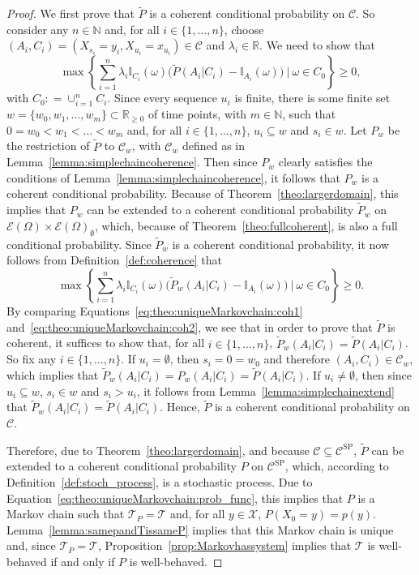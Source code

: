 \documentclass[10pt,a4paper]{paper}
\theoremstyle{definition}
\newcommand{\nats}{\mathbb{N}}
\newcommand{\reals}{\mathbb{R}}
\newcommand{\states}{\mathcal{X}}
\newcommand{\paths}{\Omega}
\newcommand{\power}{\mathcal{E}(\paths)}
\newcommand{\nonemptypower}{\power_{\emptyset}}
\newcommand{\ind}[1]{\mathbb{I}_{#1}}
\newcommand{\coloneqq}{:\!=}
\begin{document}
\begin{proof}
We first prove that $\tilde{P}$ is a coherent conditional probability on $\mathcal{C}$. So consider any $n\in\nats$ and, for all $i\in\{1,\dots,n\}$, choose $(A_i,C_i)=(X_{s_i}=y_i,X_{u_i}=x_{u_i})\in\mathcal{C}$ and $\lambda_i\in\reals$. We need to show that
\begin{equation}\label{eq:theo:uniqueMarkovchain:coh1}
\max\left\{\sum_{i=1}^n\lambda_i\ind{C_i}(\omega)\bigl(\tilde{P}(A_i\vert C_i)-\ind{A_i}(\omega)\bigr)~\Bigg\vert~\omega\in C_0\right\}\geq0,
\end{equation}
with $C_0\coloneqq\cup_{i=1}^nC_i$.
Since every sequence $u_i$ is finite, there is some finite set $w=\{w_0,w_1,\dots,w_m\}\subset\reals_{\geq0}$ of time points, with $m\in\nats$, such that $0=w_0<w_1<\dots<w_m$ and, for all $i\in\{1,\dots,n\}$, $u_i\subseteq w$ and $s_i\in w$.
Let $P_w$ be the restriction of $\tilde{P}$ to $\mathcal{C}_w$, with $\mathcal{C}_w$ defined as in Lemma~\ref{lemma:simplechaincoherence}. Then since $P_w$ clearly satisfies the conditions of Lemma~\ref{lemma:simplechaincoherence}, it follows that $P_w$ is a coherent conditional probability. Because of Theorem~\ref{theo:largerdomain}, this implies that $P_w$ can be extended to a coherent conditional probability $\tilde{P}_w$ on $\power\times\nonemptypower$, which, because of Theorem~\ref{theo:fullcoherent}, is also a full conditional probability. Since $\tilde{P}_w$ is a coherent conditional probability, it now follows from Definition~\ref{def:coherence} that
\begin{equation}\label{eq:theo:uniqueMarkovchain:coh2}
\max\left\{\sum_{i=1}^n\lambda_i\ind{C_i}(\omega)\bigl(\tilde{P}_w(A_i\vert C_i)-\ind{A_i}(\omega)\bigr)~\Bigg\vert~\omega\in C_0\right\}\geq0.
\end{equation}
By comparing Equations~\eqref{eq:theo:uniqueMarkovchain:coh1} and~\eqref{eq:theo:uniqueMarkovchain:coh2}, we see that in order to prove that $\tilde{P}$ is coherent, it suffices to show that, for all $i\in\{1,\dots,n\}$, $\tilde{P}_w(A_i\vert C_i)=\tilde{P}(A_i\vert C_i)$. So fix any $i\in\{1,\dots,n\}$. If $u_i=\emptyset$, then $s_i=0=w_0$ and therefore $(A_i,C_i)\in\mathcal{C}_w$, which implies that $\tilde{P}_w(A_i\vert C_i)=P_w(A_i\vert C_i)=\tilde{P}(A_i\vert C_i)$. If $u_i\neq\emptyset$, then since $u_i\subseteq w$, $s_i\in w$ and $s_i>u_i$, it follows from Lemma~\ref{lemma:simplechainextend} that $\tilde{P}_w(A_i\vert C_i)=\tilde{P}(A_i\vert C_i)$. Hence, $\tilde{P}$ is a coherent conditional probability on $\mathcal{C}$.


Therefore, due to Theorem~\ref{theo:largerdomain}, and because $\mathcal{C}\subseteq\mathcal{C}^\mathrm{SP}$, $\tilde{P}$ can be extended to a coherent conditional probability $P$ on $\mathcal{C}^\mathrm{SP}$, which, according to Definition~\ref{def:stoch_process}, is a stochastic process. Due to Equation~\eqref{eq:theo:uniqueMarkovchain:prob_func}, this implies that $P$ is a Markov chain such that $\mathcal{T}_P=\mathcal{T}$ and, for all $y\in\states$, $P(X_0=y)=p(y)$. Lemma~\ref{lemma:samepandTissameP} implies that this Markov chain is unique and, since $\mathcal{T}_P=\mathcal{T}$, Proposition~\ref{prop:Markovhassystem} implies that $\mathcal{T}$ is well-behaved if and only if $P$ is well-behaved.
\end{proof}
\end{document}
